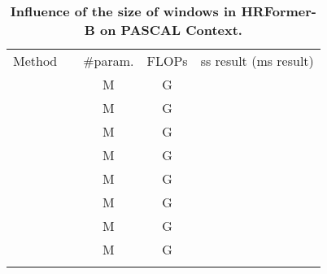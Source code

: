 \documentclass{article}
\begin{document}
\begin{table}[!htbp]
  \footnotesize
  \centering
  \setlength{\tabcolsep}{14pt}
  \renewcommand{\arraystretch}{1.2}
  \caption{\label{tab:window_size}\textbf{Influence of the size of windows  in HRFormer-B on PASCAL Context.}}
  {
    \begin{tabular}{l|c|cc|c}
      \shline
      Method & {} & \#param. & FLOPs   & ss result (ms result) \\
      \shline
      \multirow{8}{*}{HRFormer-B + OCR}
             &               & M  & G &           \\
             &               & M  & G &           \\
             &           & M  & G &           \\
             &           & M  & G &           \\
             &           & M  & G &           \\
             &            & M  & G &           \\
             &            & M  & G &           \\
             &           & M  & G &           \\
      \shline
    \end{tabular}
  }
\end{table}



\end{document}
